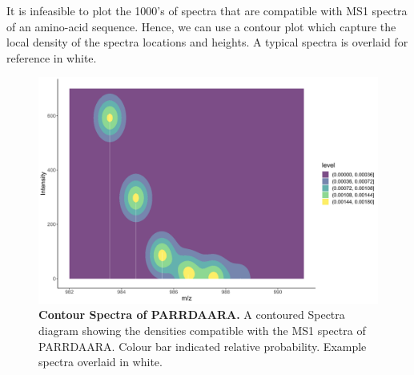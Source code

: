 \documentclass[12pt,english, journal=jpr, layout=twocolumn]{article}
\begin{document}
It is infeasible to plot the 1000's of spectra that are compatible with MS1 spectra of an amino-acid sequence. Hence, we can use a contour plot which capture the local density of the spectra locations and heights. A typical spectra is overlaid for reference in white.

 \begin{figure}[H]
 	\centering
 	\includegraphics[width =1\textwidth]{spectrauncertaintyplot.pdf}
 	\caption{\textbf{Contour Spectra of PARRDAARA.} A contoured Spectra diagram showing the densities compatible with the MS1 spectra of PARRDAARA. Colour bar indicated relative probability. Example spectra overlaid in white.}
 	\label{figure::figure3spectrauncertaintyplot}
 \end{figure}

	
\end{document}
